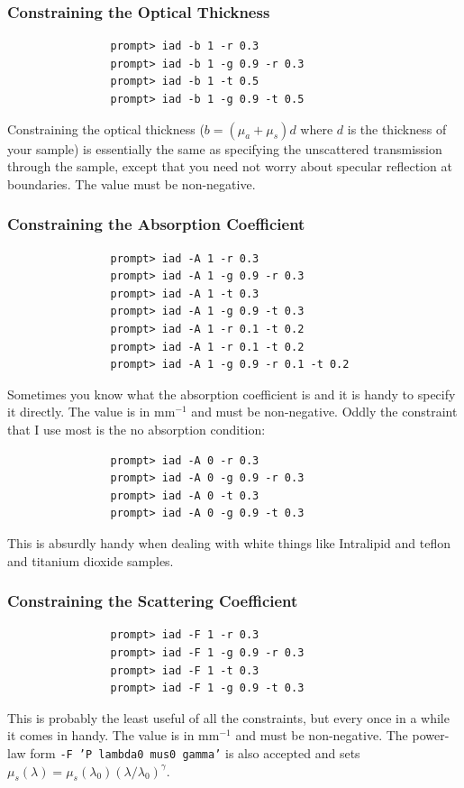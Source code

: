 \documentclass{article}
\begin{document}
\subsubsection{Constraining the Optical Thickness}

\begin{verbatim}
                prompt> iad -b 1 -r 0.3
                prompt> iad -b 1 -g 0.9 -r 0.3
                prompt> iad -b 1 -t 0.5
                prompt> iad -b 1 -g 0.9 -t 0.5
\end{verbatim}

Constraining the optical thickness ($b=(\mu_a+\mu_s)d$ where $d$ is the 
thickness of your sample) is essentially the same as specifying
the unscattered transmission through the sample, except that you need not
worry about specular reflection at boundaries.  The value must be
non-negative.

\subsubsection{Constraining the Absorption Coefficient}

\begin{verbatim}
                prompt> iad -A 1 -r 0.3
                prompt> iad -A 1 -g 0.9 -r 0.3
                prompt> iad -A 1 -t 0.3
                prompt> iad -A 1 -g 0.9 -t 0.3
                prompt> iad -A 1 -r 0.1 -t 0.2
                prompt> iad -A 1 -r 0.1 -t 0.2 
                prompt> iad -A 1 -g 0.9 -r 0.1 -t 0.2 
 \end{verbatim}

Sometimes you know what the absorption coefficient is and it is
handy to specify it directly.  The value is in mm$^{-1}$ and must be
non-negative.  Oddly the constraint that I use most
is the no absorption condition:
\begin{verbatim}
                prompt> iad -A 0 -r 0.3
                prompt> iad -A 0 -g 0.9 -r 0.3
                prompt> iad -A 0 -t 0.3
                prompt> iad -A 0 -g 0.9 -t 0.3
 \end{verbatim}
This is absurdly handy when dealing with white things like Intralipid
and teflon and titanium dioxide samples.

\subsubsection{Constraining the Scattering Coefficient}
\label{Fscat}
\begin{verbatim}
                prompt> iad -F 1 -r 0.3
                prompt> iad -F 1 -g 0.9 -r 0.3
                prompt> iad -F 1 -t 0.3
                prompt> iad -F 1 -g 0.9 -t 0.3
\end{verbatim}
This is probably the least useful of all the constraints, but every once
in a while it comes in handy.  The value is in mm$^{-1}$ and must be
non-negative.  The power-law form
\texttt{-F 'P lambda0 mus0 gamma'} is also accepted and sets
$\mu_s(\lambda)=\mu_s(\lambda_0)(\lambda/\lambda_0)^\gamma$.
\end{document}
